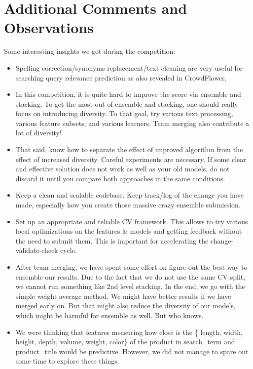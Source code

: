 \documentclass[12pt]{article}
\begin{document}
\section{Additional Comments and Observations}
Some interesting insights we got during the competition:
\begin{itemize}
\item Spelling correction/synonyms replacement/text cleaning are very useful for searching query relevance prediction as also revealed in CrowdFlower.
\item In this competition, it is quite hard to improve the score via ensemble and stacking. To get the most out of ensemble and stacking, one should really focus on introducing diversity. To that goal, try various text processing, various feature subsets, and various learners. Team merging also contribute a lot of diversity!
\item That said, know how to separate the effect of improved algorithm from the effect of increased diversity. Careful experiments are necessary. If some clear and effective solution does not work as well as your old models, do not discard it until you compare both approaches in the same conditions.
\item Keep a clean and scalable codebase. Keep track/log of the change you have made, especially how you create those massive crazy ensemble submission.
\item Set up an appropriate and reliable CV framework. This allows to try various local optimizations on the features \& models and getting feedback without the need to submit them. This is important for accelerating the change-validate-check cycle.
\item After team merging, we have spent some effort on figure out the best way to ensemble our results. Due to the fact that we do not use the same CV split, we cannot run something like 2nd level stacking. In the end, we go with the simple weight average method. We might have better results if we have merged early on. But that might also reduce the diversity of our models, which might be harmful for ensemble as well. But who knows.
\item We were thinking that features measuring how close is the \{ length, width, height, depth, volume, weight, color\} of the product in search\_term and product\_title would be predictive. However, we did not manage to spare out some time to explore these things.
\end{itemize}
\end{document}
